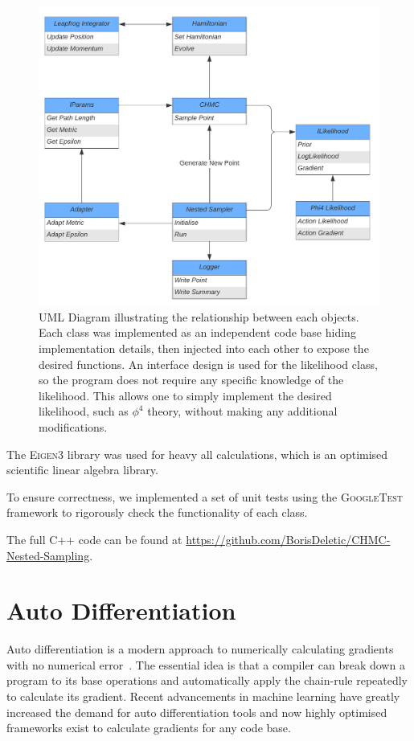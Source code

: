 \documentclass[11pt]{article}
\begin{document}
    \begin{figure}[t!]
        \center
        \includegraphics[width=\linewidth]{../figures/UML_Diagram}
        \caption{
            UML Diagram illustrating the relationship between each objects.
            Each class was implemented as an independent code base hiding implementation details, then injected into
            each other to expose the desired functions.
            An interface design is used for the likelihood class, so the program does not require any specific knowledge
            of the likelihood.
            This allows one to simply implement the desired likelihood, such as $\phi^4$ theory, without making any
            additional modifications.
        }\label{fig:uml_diagram}
    \end{figure}

    The \textsc{Eigen3} library was used for heavy all calculations, which is an optimised scientific
    linear algebra library.

    To ensure correctness, we implemented a set of unit tests using the \textsc{GoogleTest} framework to rigorously
    check the functionality of each class.

    The full C++ code can be found at \url{https://github.com/BorisDeletic/CHMC-Nested-Sampling}.

\section{Auto Differentiation}\label{sec:autodiff}
    Auto differentiation is a modern approach to numerically calculating gradients with no numerical
    error~\cite{carpenter2015stan}.
    The essential idea is that a compiler can break down a program to its base operations and automatically apply the
    chain-rule repeatedly to calculate its gradient.
    Recent advancements in machine learning have greatly increased the demand for auto differentiation tools and now
    highly optimised frameworks exist to calculate gradients for any code base.
\end{document}
